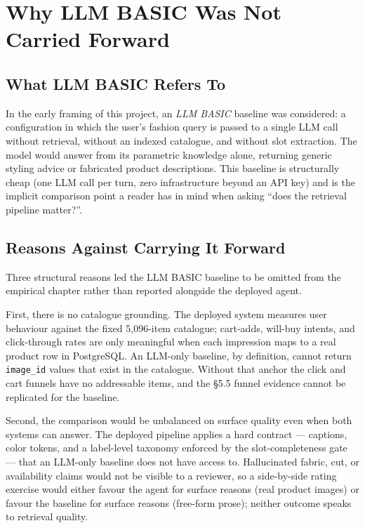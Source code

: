 \section{Why LLM BASIC Was Not Carried Forward}
\label{sec:disc_llm_basic}

\subsection{What LLM BASIC Refers To}

In the early framing of this project, an \emph{LLM BASIC} baseline was considered: a configuration in which the user's fashion query is passed to a single LLM call without retrieval, without an indexed catalogue, and without slot extraction. The model would answer from its parametric knowledge alone, returning generic styling advice or fabricated product descriptions. This baseline is structurally cheap (one LLM call per turn, zero infrastructure beyond an API key) and is the implicit comparison point a reader has in mind when asking ``does the retrieval pipeline matter?''.

\subsection{Reasons Against Carrying It Forward}

Three structural reasons led the LLM BASIC baseline to be omitted from the empirical chapter rather than reported alongside the deployed agent.

First, there is no catalogue grounding. The deployed system measures user behaviour against the fixed 5{,}096-item catalogue; cart-adds, will-buy intents, and click-through rates are only meaningful when each impression maps to a real product row in PostgreSQL. An LLM-only baseline, by definition, cannot return \texttt{image\_id} values that exist in the catalogue. Without that anchor the click and cart funnels have no addressable items, and the §5.5 funnel evidence cannot be replicated for the baseline.

Second, the comparison would be unbalanced on surface quality even when both systems can answer. The deployed pipeline applies a hard contract --- captions, color tokens, and a label-level taxonomy enforced by the slot-completeness gate --- that an LLM-only baseline does not have access to. Hallucinated fabric, cut, or availability claims would not be visible to a reviewer, so a side-by-side rating exercise would either favour the agent for surface reasons (real product images) or favour the baseline for surface reasons (free-form prose); neither outcome speaks to retrieval quality.

